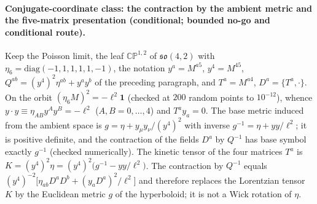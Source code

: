 \paragraph{Conjugate-coordinate class: the contraction by the ambient metric and the five-matrix presentation (conditional; bounded no-go and conditional route).} \label{detail:sec-F-paragraphconjugatecoordinatecl-34}

Keep the Poisson limit, the leaf \(\mathbb{CP}^{1,2}\) of \(\mathfrak{so}(4,2)\) with \(\eta_6=\mathrm{diag}(-1,1,1,1,1,-1)\), the notation \(y^a=M^{a5}\), \(y^4=M^{45}\), \(Q^{ab}=(y^4)^2\eta^{ab}+y^ay^b\) of the preceding paragraph, and \(T^a=M^{a4}\), \(D^a=\{T^a,\cdot\}\). On the orbit \((\eta_6M)^2=-\ell^2\mathbf 1\) (checked at \(200\) random points to \(10^{-12}\)), whence \(y\cdot y\equiv\eta_{AB}y^Ay^B=-\ell^2\) (\(A,B=0,\dots,4\)) and \(T^ay_a=0\). The base metric induced from the ambient space is \(g=\eta+y_\mu y_\nu/(y^4)^2\) with inverse \(g^{-1}=\eta+yy/\ell^2\); it is positive definite, and the contraction of the fields \(D^a\) by \(Q^{-1}\) has base symbol exactly \(g^{-1}\) (checked numerically). The kinetic tensor of the four matrices \(T^a\) is \(K=(y^4)^2\eta=(y^4)^2\bigl(g^{-1}-yy/\ell^2\bigr)\). The contraction by \(Q^{-1}\) equals \((y^4)^{-2}\bigl[\eta_{ab}D^aD^b+(y_aD^a)^2/\ell^2\bigr]\) and therefore replaces the Lorentzian tensor \(K\) by the Euclidean metric \(g\) of the hyperboloid; it is not a Wick rotation of \(\eta\).



